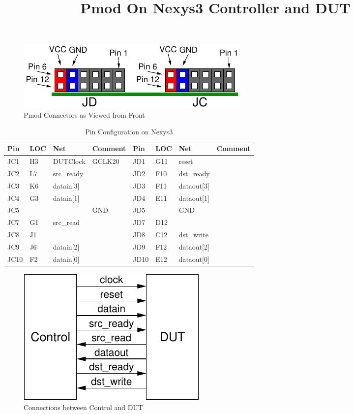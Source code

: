 \documentclass{article}
\begin{document}
\title{Pmod On Nexys3 Controller and DUT}

\maketitle

\begin{figure}[ht]
  \begin{center}
    \includegraphics[scale=1]{figures/pmod_connector}
    \caption{Pmod Connectors as Viewed from Front}
  \end{center}
\end{figure}

\begin{table}[ht]
  \begin{center}
    \caption{Pin Configuration on Nexys3}
    \begin{tabular}{llll|llll}
      Pin  & LOC & Net         & Comment & Pin  & LOC & Net        & Comment \\ \hline
       JC1 & H3  & DUTClock    & GCLK20  &  JD1 & G11 & reset      & \\
       JC2 & L7  & src\_ready  &         &  JD2 & F10 & dst\_ready & \\
       JC3 & K6  & datain[3]   &         &  JD3 & F11 & dataout[3] & \\
       JC4 & G3  & datain[1]   &         &  JD4 & E11 & dataout[1] & \\
       JC5 &	 & 			   & GND     &  JD5 &     & GND        & \\
       JC7 & G1  & src\_read   &         &  JD7 & D12 &            &\\
       JC8 & J1  & 			   &         &  JD8 & C12 & dst\_write & \\
       JC9 & J6  & datain[2]   &         &  JD9 & F12 & dataout[2] & \\
      JC10 & F2  & datain[0]   &         & JD10 & E12 & dataout[0] & \\
    \end{tabular}
  \end{center}
\end{table}

\begin{figure}[ht]
  \begin{center}
    \includegraphics[scale=1]{figures/ctrl-dut_connections}
    \caption{Connections between Control and DUT}
  \end{center}
\end{figure}
\end{document}
